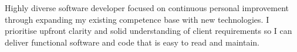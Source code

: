 \par{
  Highly diverse software developer focused on continuous personal improvement
  through expanding my existing competence base with new technologies. I
  prioritise upfront clarity and solid understanding of client requirements so
  I can deliver functional software and code that is easy to read and maintain.
}